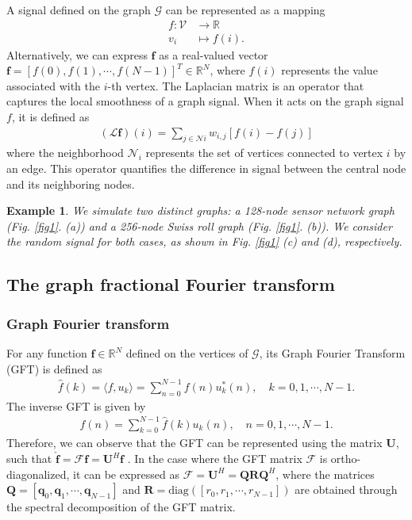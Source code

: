 \documentclass[lettersize,journal]{IEEEtran}
\newtheorem{example}{Example}
\begin{document}
A signal defined on the graph $\mathcal{G}$ can be represented as a mapping \cite{yan2021windowed}
\begin{align}
	{f}: \mathcal{V} & \rightarrow \mathbb{R} \nonumber \\
	v_i & \mapsto f(i). 
\end{align}
Alternatively, we can express $\mathbf{f}$ as a real-valued vector $\mathbf{f}=\left[f(0), f(1),\cdots,f(N-1)\right]^T \in \mathbb{R}^N$, where $f(i)$ represents the value associated with the $i$-th vertex.
The Laplacian matrix is an operator that captures the local smoothness of a graph signal. When it acts on the graph signal $f$, it is defined as
\begin{align}
	(\mathcal{L} \mathbf{f})(i)=\sum_{j \in \mathcal{N}i} w_{i, j}[f(i)-f(j)]
\end{align}
where the neighborhood $\mathcal{N}_i$ represents the set of vertices connected to vertex $i$ by an edge. This operator quantifies the difference in signal between the central node and its neighboring nodes.

\begin{example}
	\label{exam1}
	We simulate two distinct graphs: a 128-node sensor network graph (Fig. \ref{fig1}. (a)) and a 256-node Swiss roll graph (Fig. \ref{fig1}. (b)). We consider the random signal for both cases, as shown in Fig. \ref{fig1} (c) and (d), respectively.
\end{example}

\subsection{The graph fractional Fourier transform}
\subsubsection{Graph Fourier transform}
For any function $\mathbf{f}\in \mathbb{R}^N$ defined on the vertices of $\mathcal{G}$, its Graph Fourier Transform (GFT) is defined as  \cite{shuman2013emmerging}
\begin{align}
	\label{eq3}
	\hat{f}(k) = \langle f, u_k\rangle = \sum_{n=0}^{N-1} f(n)u_k^*(n), \quad k=0,1,\cdots,N-1.
\end{align}
The inverse GFT is given by
\begin{align}
	f(n) = \sum_{k=0}^{N-1} \hat{f}(k)u_k(n), \quad n=0,1,\cdots,N-1.
\end{align}
Therefore, we can observe that the GFT can be represented using the matrix $\mathbf{U}$, such that $\hat{\mathbf{f}} = \mathcal{F}\mathbf{f} = \mathbf{U}^H \mathbf{f}$ \cite{ortega2018graph}. In the case where the GFT matrix $\mathcal{F}$ is ortho-diagonalized, it can be expressed as $\mathcal{F}=\mathbf{U}^H=\mathbf{Q} \mathbf{R} \mathbf{Q}^H$, where the matrices $\mathbf{Q}=\left[\mathbf{q}_0, \mathbf{q}_1, \cdots, \mathbf{q}_{N-1}\right]$ and $\mathbf{R}=\mathrm{diag}\left( \left[r_0, r_1, \cdots, r_{N-1}\right] \right)$ are obtained through the spectral decomposition of the GFT matrix.
\end{document}
